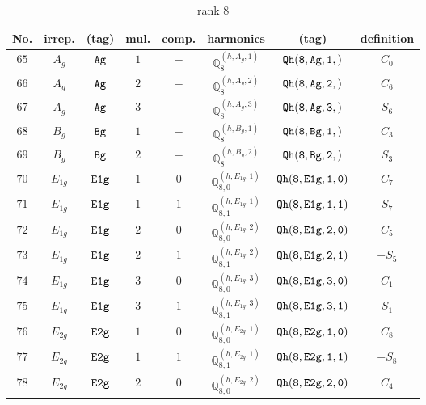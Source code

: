 \documentclass[fleqn,8pt]{jsarticle}
\begin{document}
\begin{table}[ht!]
\begin{center}
\caption{rank 8}
\renewcommand{\arraystretch}{1.3}
\begin{tabular}{cccccccc} \hline \hline
No. & irrep. & (tag) & mul. & comp. & harmonics & (tag) & definition \\ \hline
$ 65 $ & $ A_{g} $ & $ {\tt Ag} $ & $ 1 $ & $ - $ & $ \mathbb{Q}_{8}^{(h,A_{g},1)} $ & $ {\tt Qh(8,Ag,1,)} $ & $ C_{0} $ \\
$ 66 $ & $ A_{g} $ & $ {\tt Ag} $ & $ 2 $ & $ - $ & $ \mathbb{Q}_{8}^{(h,A_{g},2)} $ & $ {\tt Qh(8,Ag,2,)} $ & $ C_{6} $ \\
$ 67 $ & $ A_{g} $ & $ {\tt Ag} $ & $ 3 $ & $ - $ & $ \mathbb{Q}_{8}^{(h,A_{g},3)} $ & $ {\tt Qh(8,Ag,3,)} $ & $ S_{6} $ \\
$ 68 $ & $ B_{g} $ & $ {\tt Bg} $ & $ 1 $ & $ - $ & $ \mathbb{Q}_{8}^{(h,B_{g},1)} $ & $ {\tt Qh(8,Bg,1,)} $ & $ C_{3} $ \\
$ 69 $ & $ B_{g} $ & $ {\tt Bg} $ & $ 2 $ & $ - $ & $ \mathbb{Q}_{8}^{(h,B_{g},2)} $ & $ {\tt Qh(8,Bg,2,)} $ & $ S_{3} $ \\
$ 70 $ & $ E_{1g} $ & $ {\tt E1g} $ & $ 1 $ & $ 0 $ & $ \mathbb{Q}_{8,0}^{(h,E_{1g},1)} $ & $ {\tt Qh(8,E1g,1,0)} $ & $ C_{7} $ \\
$ 71 $ & $ E_{1g} $ & $ {\tt E1g} $ & $ 1 $ & $ 1 $ & $ \mathbb{Q}_{8,1}^{(h,E_{1g},1)} $ & $ {\tt Qh(8,E1g,1,1)} $ & $ S_{7} $ \\
$ 72 $ & $ E_{1g} $ & $ {\tt E1g} $ & $ 2 $ & $ 0 $ & $ \mathbb{Q}_{8,0}^{(h,E_{1g},2)} $ & $ {\tt Qh(8,E1g,2,0)} $ & $ C_{5} $ \\
$ 73 $ & $ E_{1g} $ & $ {\tt E1g} $ & $ 2 $ & $ 1 $ & $ \mathbb{Q}_{8,1}^{(h,E_{1g},2)} $ & $ {\tt Qh(8,E1g,2,1)} $ & $ - S_{5} $ \\
$ 74 $ & $ E_{1g} $ & $ {\tt E1g} $ & $ 3 $ & $ 0 $ & $ \mathbb{Q}_{8,0}^{(h,E_{1g},3)} $ & $ {\tt Qh(8,E1g,3,0)} $ & $ C_{1} $ \\
$ 75 $ & $ E_{1g} $ & $ {\tt E1g} $ & $ 3 $ & $ 1 $ & $ \mathbb{Q}_{8,1}^{(h,E_{1g},3)} $ & $ {\tt Qh(8,E1g,3,1)} $ & $ S_{1} $ \\
$ 76 $ & $ E_{2g} $ & $ {\tt E2g} $ & $ 1 $ & $ 0 $ & $ \mathbb{Q}_{8,0}^{(h,E_{2g},1)} $ & $ {\tt Qh(8,E2g,1,0)} $ & $ C_{8} $ \\
$ 77 $ & $ E_{2g} $ & $ {\tt E2g} $ & $ 1 $ & $ 1 $ & $ \mathbb{Q}_{8,1}^{(h,E_{2g},1)} $ & $ {\tt Qh(8,E2g,1,1)} $ & $ - S_{8} $ \\
$ 78 $ & $ E_{2g} $ & $ {\tt E2g} $ & $ 2 $ & $ 0 $ & $ \mathbb{Q}_{8,0}^{(h,E_{2g},2)} $ & $ {\tt Qh(8,E2g,2,0)} $ & $ C_{4} $ \\

\end{tabular}
\end{center}
\end{table}
\end{document}

